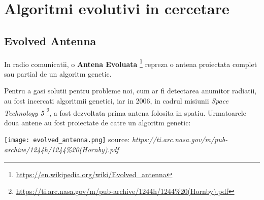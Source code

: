 \pagebreak
\section{Algoritmi evolutivi in cercetare}

\subsection{Evolved Antenna}

In radio comunicatii, o \textbf{Antena Evoluata} \footnote{\url{https://en.wikipedia.org/wiki/Evolved_antenna}} repreza o antena proiectata complet sau partial de un algoritm genetic. 

Pentru a gasi solutii pentru probleme noi, cum ar fi detectarea anumitor radiatii, au fost incercati algoritmii genetici, iar in 2006, in cadrul misiunii \textit{Space Technology 5} \footnote{\url{https://ti.arc.nasa.gov/m/pub-archive/1244h/1244\%20(Hornby).pdf}}, a fost dezvoltata prima antena folosita in spatiu. Urmatoarele doua antene au fost proiectate de catre un algoritm genetic:
\begin{center}
\texttt{[image: evolved\_antenna.png]}
source: \textit{https://ti.arc.nasa.gov/m/pub-archive/1244h/1244\%20(Hornby).pdf}
\end{center}